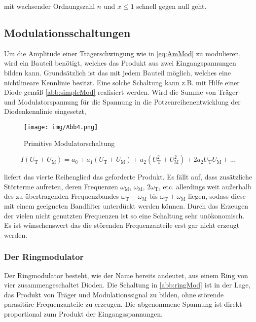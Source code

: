 \noindent mit wachsender Ordnungszahl $n$ und $x \leq 1$ schnell gegen null geht.

\FloatBarrier

\subsection{Modulationsschaltungen}
Um die Amplitude einer Trägerschwingung wie in \autoref{eq:AmMod} zu modulieren, wird ein Bauteil benötigt, welches das Produkt aus zwei Eingangspannungen bilden kann. Grundsätzlich ist das mit jedem Bauteil möglich, welches eine nichtlineare Kennlinie besitzt.
Eine solche Schaltung kann z.B. mit Hilfe einer Diode gemäß \autoref{abb:simpleMod} realisiert werden. Wird die Summe von Träger- und Modulatorspannung für die Spannung in die Potzenreihenentwicklung der Diodenkennlinie eingesetzt,

\begin{figure}
	\centering
	\texttt{[image: img/Abb4.png]}
	\caption{Primitive Modulatorschaltung \cite{FP}}
	\label{abb:simpleMod}
\end{figure}

\begin{equation}
I(U_\text{T} + U_\text{M}) = a_0 + a_1(U_\text{T} + U_\text{M}) + a_2(U_\text{T}^2 + U_\text{M}^2) + 2a_2 U_\text{T} U_\text{M} + ...
\end{equation}

\noindent liefert das vierte Reihenglied das geforderte Produkt. Es fällt auf, dass zusätzliche Störterme aufreten, deren Frequenzen  $\omega_\text{M}$, $\omega_\text{M}$, $2\omega_\text{T}$, etc. allerdings weit außerhalb des zu übertragenden Frequenzbandes $\omega_\text{T} - \omega_\text{M}$ bis $\omega_\text{T} + \omega_\text{M}$ liegen, sodass diese mit einem geeigneten Bandfilter unterdückt werden können.
Durch das Erzeugen der vielen nicht genutzten Frequenzen ist so eine Schaltung sehr unökonomisch. Es ist wünschenswert das die störenden Frequenzanteile erst gar nicht erzeugt werden.

\FloatBarrier

\subsubsection{Der Ringmodulator}
Der Ringmodulator besteht, wie der Name bereits andeutet, aus einem Ring von vier zusammengeschaltet Dioden. Die Schaltung in \autoref{abb:ringMod} ist in der Lage, das Produkt von Träger und Modulationssignal zu bilden, ohne störende parasitäre Frequenzanteile zu erzeugen. Die abgenommene Spannung ist direkt proportional zum Produkt der Eingangsspannungen.

